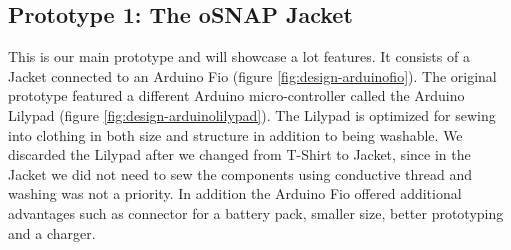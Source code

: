 \subsection{Prototype 1: The oSNAP Jacket}
This is our main prototype and will showcase a lot features.
It consists of a Jacket connected to an Arduino Fio (figure \ref{fig:design-arduinofio}). The original prototype featured a different
Arduino micro-controller called the Arduino Lilypad (figure \ref{fig:design-arduinolilypad}). The Lilypad is optimized for sewing into 
clothing in both size and structure in addition to being washable. We discarded the Lilypad after we changed from T-Shirt to Jacket,
since in the Jacket we did not need to sew the components using conductive thread and washing was not a priority. In addition the 
Arduino Fio offered additional advantages such as connector for a battery pack, smaller size, better prototyping and a charger.

